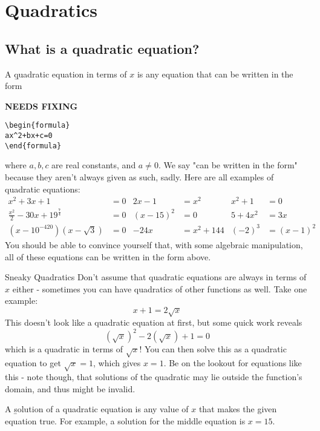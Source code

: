 \chapter{Quadratics}
\section{What is a quadratic equation?}
A \b{quadratic equation} in terms of $x$ is any equation that can be written in the form 

{\hfill\Large\bfseries NEEDS FIXING\hfill}
\begin{lstlisting}
\begin{formula}
ax^2+bx+c=0
\end{formula}
 \end{lstlisting}
where $a,b,c$ are real constants, and $a\neq0$. We say "can be written in the form" because they aren't always given as such, sadly. Here are all examples of quadratic equations:
\begin{align}
    x^2+3x+1&=0 & 2x-1&=x^2 & x^2 + 1 &= 0 \\
    \frac{x^2}{2}-30x+19^{\frac74}&=0  & (x-15)^2&=0  & 5+4x^2&=3x \\
    (x-10^{-420})(x-\sqrt{3})&=0 & -24x&=x^2+144 & (-2)^3&=(x-1)^2
\end{align}
You should be able to convince yourself that, with some algebraic manipulation, all of these equations can be written in the form above.

\begin{insight}{Sneaky Quadratics}
Don't assume that quadratic equations are always in terms of $x$ either - sometimes you can have quadratics of other functions as well. Take one example: $$x+1=2\sqrt{x}$$ This doesn't look like a quadratic equation at first, but some quick work reveals $$(\sqrt{x})^2-2(\sqrt{x})+1=0$$ which is a quadratic in terms of $\sqrt{x}$! You can then solve this as a quadratic equation to get $\sqrt{x}=1$, which gives $x=1$. Be on the lookout for equations like this - note though, that solutions of the quadratic may lie outside the function's domain, and thus might be invalid.
\end{insight}


A \b{solution} of a quadratic equation is any value of $x$ that makes the given equation true. For example, a solution for the middle equation is $x=15$.

